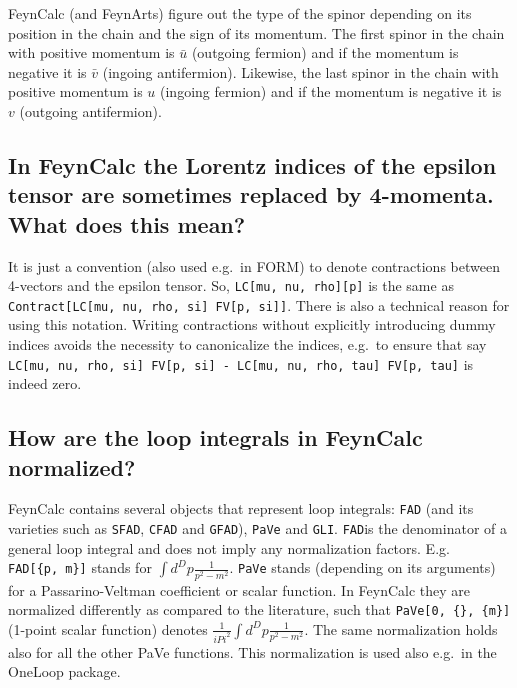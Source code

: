 \documentclass[../FeynCalcManual.tex]{subfiles}
\begin{document}
FeynCalc (and FeynArts) figure out the type of the spinor depending on
its position in the chain and the sign of its momentum. The first spinor
in the chain with positive momentum is \(\bar{u}\) (outgoing fermion)
and if the momentum is negative it is \(\bar{v}\) (ingoing antifermion).
Likewise, the last spinor in the chain with positive momentum is \(u\)
(ingoing fermion) and if the momentum is negative it is \(v\) (outgoing
antifermion).

\subsection{In FeynCalc the Lorentz indices of the epsilon tensor are
sometimes replaced by 4-momenta. What does this
mean?}\label{in-feyncalc-the-lorentz-indices-of-the-epsilon-tensor-are-sometimes-replaced-by-4-momenta.-what-does-this-mean}

It is just a convention (also used e.g.~in FORM) to denote contractions
between 4-vectors and the epsilon tensor. So,
\texttt{LC[\allowbreak{}mu,\ \allowbreak{}nu,\ \allowbreak{}rho][\allowbreak{}p]}
is the same as
\texttt{Contract[\allowbreak{}LC[\allowbreak{}mu,\ \allowbreak{}nu,\ \allowbreak{}rho,\ \allowbreak{}si] FV[\allowbreak{}p,\ \allowbreak{}si]]}.
There is also a technical reason for using this notation. Writing
contractions without explicitly introducing dummy indices avoids the
necessity to canonicalize the indices, e.g.~to ensure that say
\texttt{LC[\allowbreak{}mu,\ \allowbreak{}nu,\ \allowbreak{}rho,\ \allowbreak{}si] FV[\allowbreak{}p,\ \allowbreak{}si] - LC[\allowbreak{}mu,\ \allowbreak{}nu,\ \allowbreak{}rho,\ \allowbreak{}tau] FV[\allowbreak{}p,\ \allowbreak{}tau]}
is indeed zero.

\subsection{How are the loop integrals in FeynCalc
normalized?}\label{how-are-the-loop-integrals-in-feyncalc-normalized}

FeynCalc contains several objects that represent loop integrals:
\texttt{FAD} (and its varieties such as \texttt{SFAD}, \texttt{CFAD} and
\texttt{GFAD}), \texttt{PaVe} and \texttt{GLI}. \texttt{FAD}is the
denominator of a general loop integral and does not imply any
normalization factors. E.g.
\texttt{FAD[\allowbreak{}\{\allowbreak{}p,\ \allowbreak{}m\}]} stands
for \(\int d^D p \frac{1}{p^2-m^2}\). \texttt{PaVe} stands (depending on
its arguments) for a Passarino-Veltman coefficient or scalar function.
In FeynCalc they are normalized differently as compared to the
literature, such that
\texttt{PaVe[\allowbreak{}0,\ \allowbreak{}\{\allowbreak{}\},\ \allowbreak{}\{\allowbreak{}m\}]}
(1-point scalar function) denotes
\(\frac{1}{i Pi^2} \int d^D p \frac{1}{p^2-m^2}\). The same
normalization holds also for all the other PaVe functions. This
normalization is used also e.g.~in the OneLoop package.
\end{document}
